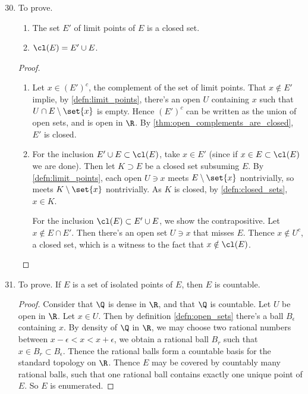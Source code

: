 \documentclass[onesided]{ccg-pset}
\begin{document}
\begin{enumerate}
    \setcounter{enumi}{29}
\item To prove.
        \begin{enumerate}
            \item The set $E'$ of limit points of $E$ is a closed set.
            \item $\cl(E) = E' \cup E$.
        \end{enumerate}
        \begin{proof}

        \begin{enumerate}
            \item Let $x \in (E')^c$, the complement of the set of limit points. That $x \not\in E'$ implie, by \ref{defn:limit_points}, there's an open $U$ containing $x$ such that $U \cap E\setminus\set{x}$ is empty. Hence $(E')^c$ can be written as the union of open sets, and is open in $\R$. By \ref{thm:open_complements_are_closed}, $E'$ is closed.
            \item For the inclusion $E' \cup E \subset \cl(E)$, take $x \in E'$ (since if $x \in E \subset \cl(E)$ we are done). Then let $K \supset E$ be a closed set subsuming $E$. By \ref{defn:limit_points}, each open $U \ni x$ meets $E\setminus\set{x}$ nontrivially, so meets $K \setminus\set{x}$ nontrivially. As $K$ is closed, by \ref{defn:closed_sets}, $x \in K$. 

                For the inclusion $\cl(E) \subset E' \cup E$, we show the contrapositive. Let $x \notin E \cap E'$. Then there's an open set $U \ni x$ that misses $E$. Thence $x \notin U^c$, a closed set, which is a witness to the fact that $x \notin \cl(E)$. 
        \end{enumerate}
        \end{proof}

    \item To prove. If $E$ is a set of isolated points of $E$, then $E$ is countable.
        \begin{proof}
            Consider that $\Q$ is dense in $\R$, and that $\Q$ is countable. Let $U$ be open in $\R$. Let $x \in U$. Then by definition \ref{defn:open_sets} there's a ball $B_\epsilon$ containing $x$. By density of $\Q$ in $\R$, we may choose two rational numbers between $x-\epsilon < x < x + \epsilon$, we obtain a rational ball $B_r$ such that $x \in B_r \subset B_\epsilon$. Thence the rational balls form a countable basis for the standard topology on $\R$. Thence $E$ may be covered by countably many rational balls, such that one rational ball contains exactly one unique point of $E$. So $E$ is enumerated.
        \end{proof}


\end{enumerate}
\end{document}

